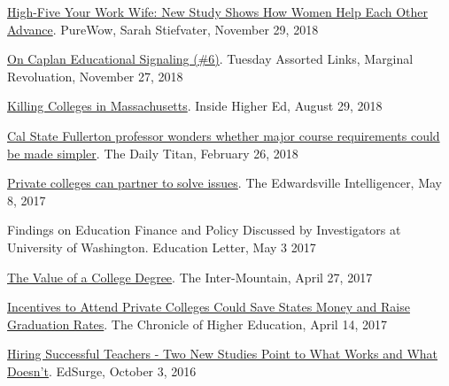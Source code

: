 \documentclass[11pt,a4paper]{article}
\begin{document}
\href{https://www.purewow.com/news/west-point-study-on-women-helping-each-other-at-work}{High-Five Your Work Wife: New Study Shows How Women Help Each Other Advance}. PureWow, Sarah Stiefvater, November 29, 2018



\href{https://marginalrevolution.com/marginalrevolution/2018/11/tuesday-assorted-links-191.html}{On Caplan Educational Signaling (\#6)}. Tuesday Assorted Links, Marginal Revoluation, November 27, 2018



\href{https://www.insidehighered.com/views/2018/08/29/state-policy-makers-should-stop-overlooking-role-private-colleges-providing-access}{Killing Colleges in Massachusetts}. Inside Higher Ed, August 29, 2018



\href{https://dailytitan.com/2018/02/cal-state-fullerton-professor-wonders-whether-major-course-requirements-made-simpler/}{Cal State Fullerton professor wonders whether major course requirements could be made simpler}. The Daily Titan, February 26, 2018



\href{http://www.theintelligencer.com/news/article/Private-colleges-can-partner-to-solve-issues-11129681.php}{Private colleges can partner to solve issues}. The Edwardsville Intelligencer, May 8, 2017



Findings on Education Finance and Policy Discussed by Investigators at University of Washington. Education Letter, May 3 2017



\href{http://www.theintermountain.com/opinion/columnists/2017/04/the-value-of-a-college-degree/}{The Value of a College Degree}. The Inter-Mountain, April 27, 2017



\href{http://www.chronicle.com/article/Incentives-to-Attend-Private/239801?cid=at\&utm_source=at\&utm_medium=en\&elqTrackId=5719cd9ce29549cf9b399520678c52f0\&elq=c46d8f380cc14466861c12899b770d6c\&elqaid=13488\&elqat=1\&elqCampaignId=5599}{Incentives to Attend Private Colleges Could Save States Money and Raise Graduation Rates}. The Chronicle of Higher Education, April 14, 2017



\href{https://www.edsurge.com/news/2016-10-03-hiring-successful-teachers-two-new-studies-point-to-what-works-and-what-doesn-t}{Hiring Successful Teachers - Two New Studies Point to What Works and What Doesn't}. EdSurge, October 3, 2016
\end{document}
